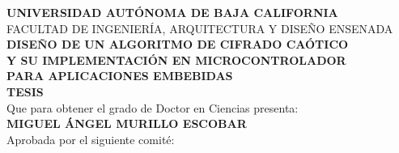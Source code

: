             
\newpage %
            
\thispagestyle{empty} %

\begin{center}

\large{\textbf{UNIVERSIDAD AUTÓNOMA DE BAJA CALIFORNIA}} \\
\vspace{0.5cm} %
\normalsize{FACULTAD DE INGENIERÍA, ARQUITECTURA Y DISEÑO ENSENADA} \\
\vspace{0.8cm} %
\textbf{DISEÑO DE UN ALGORITMO DE CIFRADO CAÓTICO \\Y SU IMPLEMENTACIÓN EN MICROCONTROLADOR \\PARA APLICACIONES EMBEBIDAS} \\
\vspace{0.8cm} %
\Large{\textbf{TESIS}} \\
\vspace{1cm} %
Que para obtener el grado de Doctor en Ciencias presenta:  \\ 
\vspace{0.5cm} %
\textbf{MIGUEL ÁNGEL MURILLO ESCOBAR} \\
\vspace{1cm} %
Aprobada por el siguiente comité: \\
\vspace{0.1cm} %


\vspace{0.1cm} %

\end{center}
